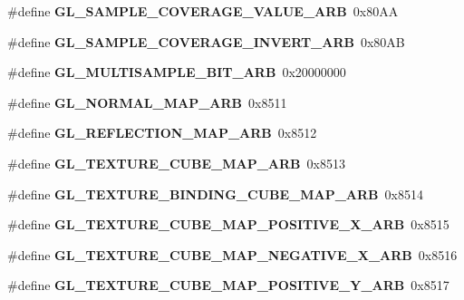 \begin{DoxyCompactItemize}
\item 
\#define {\bfseries G\+L\+\_\+\+S\+A\+M\+P\+L\+E\+\_\+\+C\+O\+V\+E\+R\+A\+G\+E\+\_\+\+V\+A\+L\+U\+E\+\_\+\+A\+R\+B}~0x80\+A\+A\label{_s_d_l__opengl_8h_ac1c034894bceb837ffbc15285d2b45ad}

\item 
\#define {\bfseries G\+L\+\_\+\+S\+A\+M\+P\+L\+E\+\_\+\+C\+O\+V\+E\+R\+A\+G\+E\+\_\+\+I\+N\+V\+E\+R\+T\+\_\+\+A\+R\+B}~0x80\+A\+B\label{_s_d_l__opengl_8h_a6bc0ecf9fe4f00a1782245b3c77e93ba}

\item 
\#define {\bfseries G\+L\+\_\+\+M\+U\+L\+T\+I\+S\+A\+M\+P\+L\+E\+\_\+\+B\+I\+T\+\_\+\+A\+R\+B}~0x20000000\label{_s_d_l__opengl_8h_ab1799cb8508f761c98608853fea4d7c6}

\item 
\#define {\bfseries G\+L\+\_\+\+N\+O\+R\+M\+A\+L\+\_\+\+M\+A\+P\+\_\+\+A\+R\+B}~0x8511\label{_s_d_l__opengl_8h_ab57a8cb4825feb2d22b5ae3fd9d55f58}

\item 
\#define {\bfseries G\+L\+\_\+\+R\+E\+F\+L\+E\+C\+T\+I\+O\+N\+\_\+\+M\+A\+P\+\_\+\+A\+R\+B}~0x8512\label{_s_d_l__opengl_8h_adc6c44e58bdb9530731c3bdde5c57b10}

\item 
\#define {\bfseries G\+L\+\_\+\+T\+E\+X\+T\+U\+R\+E\+\_\+\+C\+U\+B\+E\+\_\+\+M\+A\+P\+\_\+\+A\+R\+B}~0x8513\label{_s_d_l__opengl_8h_a6345477179677cbc9d23149a0c2338ca}

\item 
\#define {\bfseries G\+L\+\_\+\+T\+E\+X\+T\+U\+R\+E\+\_\+\+B\+I\+N\+D\+I\+N\+G\+\_\+\+C\+U\+B\+E\+\_\+\+M\+A\+P\+\_\+\+A\+R\+B}~0x8514\label{_s_d_l__opengl_8h_ab746ba2030709d933ddd9355beceee85}

\item 
\#define {\bfseries G\+L\+\_\+\+T\+E\+X\+T\+U\+R\+E\+\_\+\+C\+U\+B\+E\+\_\+\+M\+A\+P\+\_\+\+P\+O\+S\+I\+T\+I\+V\+E\+\_\+\+X\+\_\+\+A\+R\+B}~0x8515\label{_s_d_l__opengl_8h_a4504ef42f9abf044ed41c11d8d20bdbe}

\item 
\#define {\bfseries G\+L\+\_\+\+T\+E\+X\+T\+U\+R\+E\+\_\+\+C\+U\+B\+E\+\_\+\+M\+A\+P\+\_\+\+N\+E\+G\+A\+T\+I\+V\+E\+\_\+\+X\+\_\+\+A\+R\+B}~0x8516\label{_s_d_l__opengl_8h_aea7d57e726bd12de57be89bd9575b7ac}

\item 
\#define {\bfseries G\+L\+\_\+\+T\+E\+X\+T\+U\+R\+E\+\_\+\+C\+U\+B\+E\+\_\+\+M\+A\+P\+\_\+\+P\+O\+S\+I\+T\+I\+V\+E\+\_\+\+Y\+\_\+\+A\+R\+B}~0x8517\label{_s_d_l__opengl_8h_a4d5ef0ad5b048658cb396166032353ff}


\end{DoxyCompactItemize}
